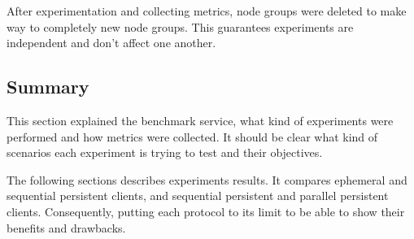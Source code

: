 After experimentation and collecting metrics, node groups were deleted to make way to completely new node groups. This guarantees experiments are independent and don't affect one another.

\subsection{Summary}

This section explained the benchmark service, what kind of experiments were performed and how metrics were collected. It should be clear what kind of scenarios each experiment is trying to test and their objectives.

The following sections describes experiments results. It compares ephemeral and sequential persistent clients, and sequential persistent and parallel persistent clients. Consequently, putting each protocol to its limit to be able to show their benefits and drawbacks.